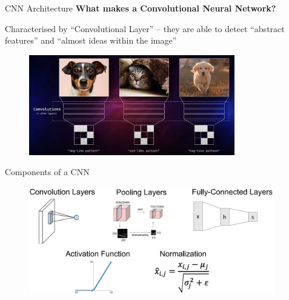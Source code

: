 \begin{frame}{CNN Architecture}
    \textbf{What makes a Convolutional Neural Network?}
    
    Characterised by “Convolutional Layer” – they are able to detect “abstract features” and “almost ideas within the image”

    \newline

    \begin{figure}
    \centering
    \includegraphics[width=0.8\textwidth,height=0.75\textheight,keepaspectratio]{images/cnn/what-makes-cnn.png}
    \end{figure}
\end{frame}

\begin{frame}{Components of a CNN}
    \begin{figure}
    \centering
    \includegraphics[width=0.95\textwidth,height=0.95\textheight,keepaspectratio]{images/cnn/cnn-components.png}
    \end{figure}
\end{frame}
